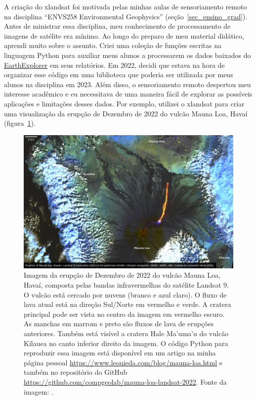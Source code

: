 \documentclass[10pt,a4paper,oneside]{book}
\begin{document}
A criação do xlandsat foi motivada pelas minhas aulas de sensoriamento
remoto na disciplina ``ENVS258 Environmental Geophysics''
(seção~\ref{sec_ensino_grad}).
Antes de ministrar essa disciplina, meu conhecimento de processamento de
imagens de satélite era mínimo.
Ao longo do preparo de meu material didático, aprendi muito sobre o assunto.
Criei uma coleção de funções escritas na linguagem Python para auxiliar meus
alunos a processarem os dados baixados do
\href{https://earthexplorer.usgs.gov/}{EarthExplorer} em seus relatórios.
Em 2022, decidi que estava na hora de organizar esse código em uma biblioteca
que poderia ser utilizada por meus alunos na disciplina em 2023.
Além disso, o sensoriamento remoto despertou meu interesse acadêmico e
eu necessitava de uma maneira fácil de explorar as possíveis aplicações e
limitações desses dados.
Por exemplo, utilizei o xlandsat para criar uma visualização da erupção de
Dezembro de 2022 do vulcão Mauna Loa, Havaí (figura~\ref{fig_maunaloa}).

\begin{figure}[tb]
  \begin{center}
    \includegraphics[width=\textwidth]{images/mauna-loa-landsat-2022-12-02.jpg}
  \end{center}
  \caption{
    Imagem da erupção de Dezembro de 2022 do vulcão Mauna Loa, Havaí, composta
    pelas bandas infravermelhas do satélite Landsat 9.
    O vulcão está cercado por nuvens (branco e azul claro). O fluxo de lava
    atual está na direção Sul/Norte em vermelho e verde. A cratera principal
    pode ser vista no centro da imagem em vermelho escuro.
    As manchas em marrom e preto são fluxos de lava de erupções anteriores.
    Também está visível a cratera Hale Ma'uma'u do vulcão Kīlauea no canto
    inferior direito da imagem.
    O código Python para reproduzir essa imagem está disponível em um artigo na
    minha página pessoal \url{https://www.leouieda.com/blog/mauna-loa.html} e
    também no repositório do GitHub
    \url{https://github.com/compgeolab/mauna-loa-landsat-2022}.
    Fonte da imagem: \citet[][CC0]{Uieda2022maunaloa}.
  }
  \label{fig_maunaloa}
\end{figure}
\end{document}
